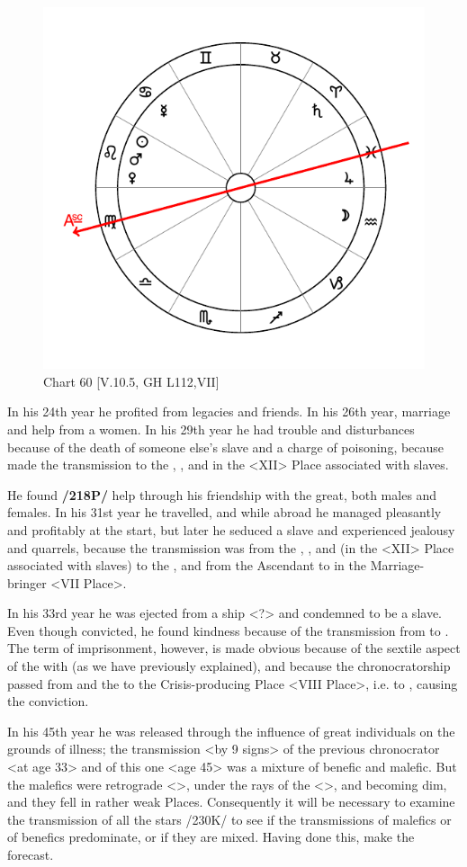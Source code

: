 \begin{figure}
\centering
\vspace{-20pt}
\includegraphics[width=.68\textwidth]{charts/5_10_05}
\caption{Chart 60 [V.10.5, GH L112,VII]}
\label{fig:chart60}
\end{figure}


In his 24th year he profited from legacies and friends. In his 26th
year, marriage and help from a women. In his 29th year he had trouble and disturbances because of the death of someone else’s slave and a charge of poisoning, because \Saturn\xspace made the transmission to the \Sun, \Mars, and \Venus\xspace in the <XII> Place associated with slaves. 

He found \textbf{/218P/} help through his friendship with the great, both males and females. In his 31st year he travelled, and while abroad he managed pleasantly and profitably at the start, but later he seduced a slave and experienced jealousy and quarrels, because the transmission was from the \Sun, \Venus, and \Mars (in the <XII> Place associated with slaves) to the \Moon, and from the Ascendant to \Jupiter\xspace in the Marriage-bringer <VII Place>. 

In his 33rd year he was ejected from a ship <?> and condemned to be a slave. Even though convicted, he found kindness because
of the transmission from \Mercury\xspace to \Jupiter. The term of imprisonment, however, is made obvious because of the sextile aspect of the \Moon\xspace with \Saturn\xspace (as we have previously explained), and because the chronocratorship passed from \Mars\xspace and the \Sun to the Crisis-producing Place <VIII Place>, i.e. to \Saturn, causing the conviction. 

In his 45th year he was released through the influence of great individuals on the grounds of illness; the transmission <by 9 signs> of the previous chronocrator <at age 33> and of this one <age 45> was a mixture of benefic and malefic. But the malefics were retrograde <\Saturn>, under the rays of the \Sun\xspace <\Mars>, and becoming dim, and they fell in rather weak Places.
Consequently it will be necessary to examine the transmission of all the stars /230K/ to see if the transmissions of malefics or of benefics predominate, or if they are mixed. Having done this, make the forecast. 

